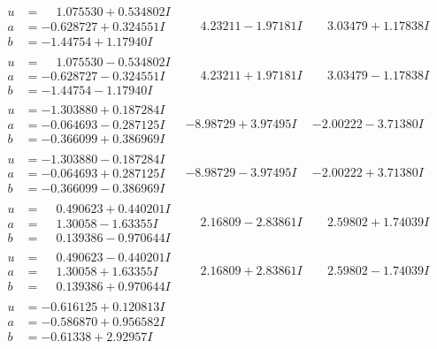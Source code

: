 \documentclass[1p]{elsarticle_modified}
\theoremstyle{definition}
\begin{document}
$$\begin{array}{c|c|c}
\begin{aligned}
u &= \phantom{-}1.075530 + 0.534802 I \\
a &= -0.628727 + 0.324551 I \\
b &= -1.44754 + 1.17940 I\end{aligned}
 & \phantom{-}4.23211 - 1.97181 I & \phantom{-}3.03479 + 1.17838 I \\ \hline\begin{aligned}
u &= \phantom{-}1.075530 - 0.534802 I \\
a &= -0.628727 - 0.324551 I \\
b &= -1.44754 - 1.17940 I\end{aligned}
 & \phantom{-}4.23211 + 1.97181 I & \phantom{-}3.03479 - 1.17838 I \\ \hline\begin{aligned}
u &= -1.303880 + 0.187284 I \\
a &= -0.064693 - 0.287125 I \\
b &= -0.366099 + 0.386969 I\end{aligned}
 & -8.98729 + 3.97495 I & -2.00222 - 3.71380 I \\ \hline\begin{aligned}
u &= -1.303880 - 0.187284 I \\
a &= -0.064693 + 0.287125 I \\
b &= -0.366099 - 0.386969 I\end{aligned}
 & -8.98729 - 3.97495 I & -2.00222 + 3.71380 I \\ \hline\begin{aligned}
u &= \phantom{-}0.490623 + 0.440201 I \\
a &= \phantom{-}1.30058 - 1.63355 I \\
b &= \phantom{-}0.139386 - 0.970644 I\end{aligned}
 & \phantom{-}2.16809 - 2.83861 I & \phantom{-}2.59802 + 1.74039 I \\ \hline\begin{aligned}
u &= \phantom{-}0.490623 - 0.440201 I \\
a &= \phantom{-}1.30058 + 1.63355 I \\
b &= \phantom{-}0.139386 + 0.970644 I\end{aligned}
 & \phantom{-}2.16809 + 2.83861 I & \phantom{-}2.59802 - 1.74039 I \\ \hline\begin{aligned}
u &= -0.616125 + 0.120813 I \\
a &= -0.586870 + 0.956582 I \\
b &= -0.61338 + 2.92957 I\end{aligned}

\end{array}$$
\end{document}
